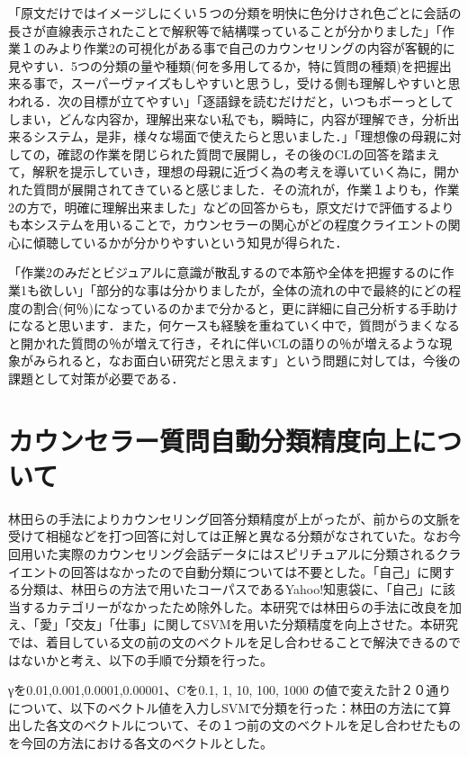 \documentclass[shuuron]{kuee}
\begin{document}
「原文だけではイメージしにくい５つの分類を明快に色分けされ色ごとに会話の長さが直線表示されたことで解釈等で結構喋っていることが分かりました」「作業１のみより作業2の可視化がある事で自己のカウンセリングの内容が客観的に見やすい．5つの分類の量や種類(何を多用してるか，特に質問の種類)を把握出来る事で，スーパーヴァイズもしやすいと思うし，受ける側も理解しやすいと思われる．次の目標が立てやすい」「逐語録を読むだけだと，いつもボーっとしてしまい，どんな内容か，理解出来ない私でも，瞬時に，内容が理解でき，分析出来るシステム，是非，様々な場面で使えたらと思いました．」「理想像の母親に対しての，確認の作業を閉じられた質問で展開し，その後のCLの回答を踏まえて，解釈を提示していき，理想の母親に近づく為の考えを導いていく為に，開かれた質問が展開されてきていると感じました．その流れが，作業１よりも，作業2の方で，明確に理解出来ました」などの回答からも，原文だけで評価するよりも本システムを用いることで，カウンセラーの関心がどの程度クライエントの関心に傾聴しているかが分かりやすいという知見が得られた．

「作業2のみだとビジュアルに意識が散乱するので本筋や全体を把握するのに作業1も欲しい」「部分的な事は分かりましたが，全体の流れの中で最終的にどの程度の割合(何％)になっているのかまで分かると，更に詳細に自己分析する手助けになると思います．また，何ケースも経験を重ねていく中で，質問がうまくなると開かれた質問の％が増えて行き，それに伴いCLの語りの％が増えるような現象がみられると，なお面白い研究だと思えます」という問題に対しては，今後の課題として対策が必要である．


\section{カウンセラー質問自動分類精度向上について}%


林田ら\cite{hayashidaEn}の手法によりカウンセリング回答分類精度が上がったが、前からの文脈を受けて相槌などを打つ回答に対しては正解と異なる分類がなされていた。なお今回用いた実際のカウンセリング会話データにはスピリチュアルに分類されるクライエントの回答はなかったので自動分類については不要とした。「自己」に関する分類は、林田らの方法で用いたコーパスであるYahoo!知恵袋に、「自己」に該当するカテゴリーがなかったため除外した。本研究では林田らの手法に改良を加え、「愛」「交友」「仕事」に関してSVMを用いた分類精度を向上させた。本研究では、着目している文の前の文のベクトルを足し合わせることで解決できるのではないかと考え、以下の手順で分類を行った。

γを0.01,0.001,0.0001,0.00001、Cを0.1, 1, 10, 100, 1000
の値で変えた計２０通りについて、以下のベクトル値を入力しSVMで分類を行った：林田の方法にて算出した各文のベクトルについて、その１つ前の文のベクトルを足し合わせたものを今回の方法における各文のベクトルとした。
\end{document}
